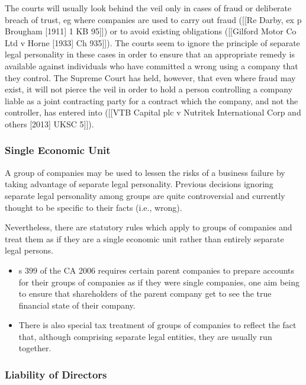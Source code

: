 \documentclass[
]{article}
\providecommand{\tightlist}{%
  \setlength{\itemsep}{0pt}\setlength{\parskip}{0pt}}
\begin{document}
The courts will usually look behind the veil only in cases of fraud or
deliberate breach of trust, eg where companies are used to carry out
fraud ({[}{[}Re Darby, ex p Brougham {[}1911{]} 1 KB 95{]}{]}) or to
avoid existing obligations ({[}{[}Gilford Motor Co Ltd v Horne
{[}1933{]} Ch 935{]}{]}). The courts seem to ignore the principle of
separate legal personality in these cases in order to ensure that an
appropriate remedy is available against individuals who have committed a
wrong using a company that they control. The Supreme Court has held,
however, that even where fraud may exist, it will not pierce the veil in
order to hold a person controlling a company liable as a joint
contracting party for a contract which the company, and not the
controller, has entered into ({[}{[}VTB Capital plc v Nutritek
International Corp and others {[}2013{]} UKSC 5{]}{]}).

\hypertarget{single-economic-unit}{%
\subsubsection{Single Economic Unit}\label{single-economic-unit}}

A group of companies may be used to lessen the risks of a business
failure by taking advantage of separate legal personality. Previous
decisions ignoring separate legal personality among groups are quite
controversial and currently thought to be specific to their facts (i.e.,
wrong).

Nevertheless, there are statutory rules which apply to groups of
companies and treat them as if they are a single economic unit rather
than entirely separate legal persons.

\begin{itemize}
\tightlist
\item
  s 399 of the CA 2006 requires certain parent companies to prepare
  accounts for their groups of companies as if they were single
  companies, one aim being to ensure that shareholders of the parent
  company get to see the true financial state of their company.
\item
  There is also special tax treatment of groups of companies to reflect
  the fact that, although comprising separate legal entities, they are
  usually run together.
\end{itemize}

\hypertarget{liability-of-directors}{%
\subsubsection{Liability of Directors}\label{liability-of-directors}}
\end{document}
